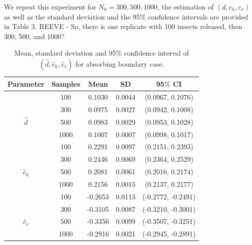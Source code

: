 \documentclass[11pt]{article}
\begin{document}
We repeat this experiment for $N_0=300, 500, 1000$, the estimation of $(d, c_h, c_v)$ as well as the standard deviation and the $95\%$ confidence intervals are provided in Table 3. REEVE - So, there is one replicate with 100 insects released, then 300, 500, and 1000?
\begin{table}[!htbp]
\centering %
\begin{tabular}{ccccc} %
\hline\hline %
Parameter &Samples & Mean & SD & 95$\%$ CI
\\ [0.5ex]
\hline %
              &100  & 0.1030 & 0.0044 & (0.0967, 0.1076) \\
              &300  & 0.0975 & 0.0027 & (0.0942, 0.1008) \\
$\hat{d}$     &500  & 0.0983 & 0.0029 & (0.0953, 0.1028)  \\
              &1000 & 0.1007 & 0.0007 & (0.0998, 0.1017)  \\
\hline
              &100  & 0.2291 & 0.0097 & (0.2151, 0.2393) \\
              &300  & 0.2446 & 0.0069 & (0.2364, 0.2529) \\
$\hat{c}_{h}$ &500  & 0.2081 &0.0061& (0.2016, 0.2174)   \\
              &1000 & 0.2156 &0.0015& (0.2137, 0.2177)   \\
\hline
              &100  & -0.2653 & 0.0113 & (-0.2772, -0.2491) \\
              &300  & -0.3105 & 0.0087 & (-0.3210, -0.3001) \\
$\hat{c}_{v}$ & 500 & -0.3356 &0.0099& (-0.3507, -0.3251) \\
              &1000 & -0.2916 &0.0021& (-0.2945, -0.2891) \\
\hline\hline %
\end{tabular}
\caption{Mean, standard deviation and 95$\%$ confidence interval of $(\hat{d}, \hat{c}_{h}, \hat{c}_{v})$ for absorbing boundary case.}
\label{tab:Estimation_of_Parameters_D_ch_cv}
\end{table}
\end{document}
